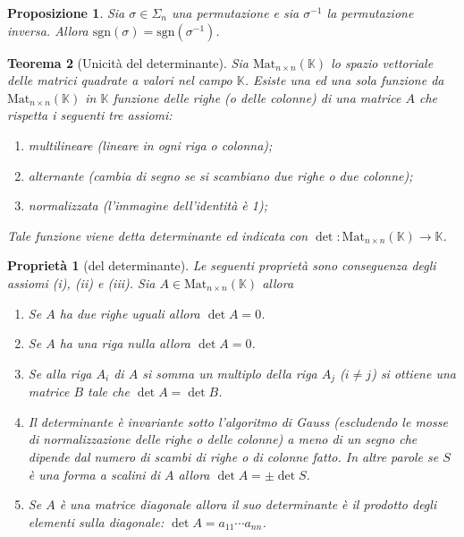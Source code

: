 \documentclass[9pt, a4paper]{article}
\newcommand{\K}{\mathbb{K}}
\newcommand{\sgn}{\mathrm{sgn}}
\theoremstyle{mythm}
\newtheorem{propriety}{Proprietà}[section]
\newtheorem{thm}{Teorema}[section]
\newtheorem{prop}[thm]{Proposizione}
\begin{document}
\begin{prop}
	Sia $ \sigma \in \Sigma_n $ una permutazione e sia $ \sigma^{-1} $ la permutazione inversa. Allora $ \sgn(\sigma) = \sgn(\sigma^{-1}) $. 
\end{prop}

\begin{thm}[Unicità del determinante]
	Sia $ \mathrm{Mat}_{n \times n} (\K) $  lo spazio vettoriale delle matrici quadrate  a valori nel campo $ \K $. Esiste una ed una sola funzione da $ \mathrm{Mat}_{n \times n} (\K) $ in $ \K $ funzione delle righe (o delle colonne) di una matrice $ A $ che rispetta i seguenti tre assiomi:  
	\begin{enumerate}[label = (\roman*)]
		\item \emph{multilineare} (lineare in ogni riga o colonna);
		\item \emph{alternante} (cambia di segno se si scambiano due righe o due colonne);
		\item \emph{normalizzata} (l'immagine dell'identità è 1);
	\end{enumerate}
	Tale funzione viene detta determinante ed indicata con $ \det \colon \mathrm{Mat}_{n \times n} (\K) \to \K $. 
\end{thm}

\begin{propriety}[del determinante]
	Le seguenti proprietà sono conseguenza degli assiomi (i), (ii) e (iii). Sia $ A \in \mathrm{Mat}_{n \times n} (\K) $ allora
	\begin{enumerate}[label = (\arabic*)]
		\item Se $ A $ ha due righe uguali allora $ \det{A} = 0 $.
		\item Se $ A $ ha una riga nulla allora $ \det{A} = 0 $.
		\item Se alla riga $ A_i $ di $ A $ si somma un multiplo della riga $ A_j $ ($ i \neq j $) si ottiene una matrice $ B $ tale che $ \det A = \det B $. 
		\item Il determinante è invariante sotto l'algoritmo di Gauss (escludendo le mosse di \emph{normalizzazione} delle righe o delle colonne) a meno di un segno che dipende dal numero di scambi di righe o di colonne fatto. In altre parole se $ S $ è una forma a scalini di $ A $ allora $ \det A = \pm \det S $.
		\item Se $ A $ è una matrice diagonale allora il suo determinante è il prodotto degli elementi sulla diagonale: $ \det A = a_{11} \cdots a_{nn} $. 
	\end{enumerate}
\end{propriety}
\end{document}
